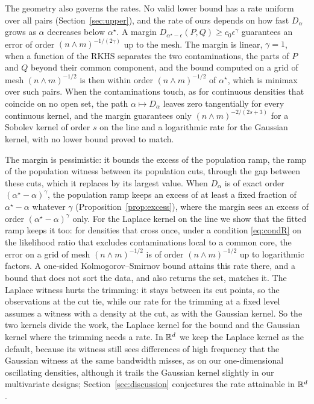 The geometry also governs the rates. No valid lower bound has a rate uniform over all pairs
(Section~\ref{sec:upper}), and the rate of ours depends on how fast $D_\alpha$ grows as $\alpha$ decreases below
$\alpha^\star$. A margin $D_{\alpha^\star-\epsilon}(P,Q)\ge c_0\epsilon^\gamma$ guarantees an error of order
$(n\wedge m)^{-1/(2\gamma)}$ up to the mesh. The margin is linear, $\gamma=1$, when a function of the RKHS separates
the two contaminations, the parts of $P$ and $Q$ beyond their common component, and the bound computed on a grid of
mesh $(n\wedge m)^{-1/2}$ is then within order $(n\wedge m)^{-1/2}$ of $\alpha^\star$, which is minimax over such
pairs. When the contaminations touch, as for continuous densities that coincide on no open set, the path
$\alpha\mapsto D_\alpha$ leaves zero tangentially for every continuous kernel, and the margin guarantees only
$(n\wedge m)^{-2/(2s+3)}$ for a Sobolev kernel of order $s$ on the line and a logarithmic rate for the Gaussian kernel,
with no lower bound proved to match.

The margin is pessimistic: it bounds the excess of the population ramp, the ramp of the population witness between
its population cuts, through the gap between these cuts, which it replaces by its largest value. When
$D_\alpha$ is of exact order $(\alpha^\star-\alpha)^\gamma$, the population ramp keeps an excess of at least a fixed
fraction of $\alpha^\star-\alpha$ whatever $\gamma$ (Proposition~\ref{prop:excess}), where the margin sees an excess of
order $(\alpha^\star-\alpha)^\gamma$ only. For the Laplace kernel on the line we show
that the fitted ramp keeps it too: for densities that cross once, under a condition \eqref{eq:condR} on the likelihood
ratio that excludes contaminations local to a common core, the error on a grid of mesh $(n\wedge m)^{-1/2}$ is of order
$(n\wedge m)^{-1/2}$ up to logarithmic factors. A one-sided Kolmogorov--Smirnov bound attains this rate there, and a
bound that does not sort the data, and also returns the set, matches it. The Laplace witness hurts the trimming: it stays
between its cut points, so the observations at the cut tie, while our rate for the trimming at a fixed level assumes a
witness with a density at the cut, as with the Gaussian kernel. So the two kernels divide the work, the Laplace kernel
for the bound and the Gaussian kernel where the trimming needs a rate. In $\mathbb{R}^d$ we keep the Laplace kernel as the
default, because its witness still sees differences of high frequency that the Gaussian witness at the same bandwidth
misses, as on our one-dimensional oscillating densities, although it trails the Gaussian kernel slightly in our
multivariate designs; Section~\ref{sec:discussion} conjectures the rate attainable in $\mathbb{R}^d$.

